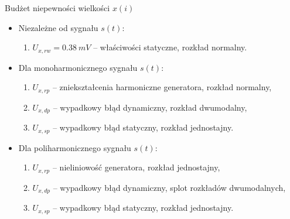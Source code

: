 \documentclass[12pt, polish, aspectratio = 169]{slides}
\begin{document}
\begin{frame}{Budżet niepewności wielkości $x(i)$}
\begin{itemize}
\item Niezależne od sygnału $s(t)$:
	\begin{enumerate}
	\item $U_{x,rw} = \qty{0.38}{mV}$ -- właściwości statyczne, rozkład normalny.
	\end{enumerate}
\item Dla monoharmonicznego sygnału $s(t)$:
	\begin{enumerate}
	\item $U_{x,rp}$ -- zniekształcenia harmoniczne generatora, rozkład normalny,
	\item $U_{x,dp}$ -- wypadkowy błąd dynamiczny, rozkład dwumodalny,
	\item $U_{x,sp}$ -- wypadkowy błąd statyczny, rozkład jednostajny.
	\end{enumerate}
\item Dla poliharmonicznego sygnału $s(t)$:
	\begin{enumerate}
	\item $U_{x,rp}$ -- nieliniowość generatora, rozkład jednostajny,
	\item $U_{x,dp}$ -- wypadkowy błąd dynamiczny, splot rozkładów dwumodalnych,
	\item $U_{x,sp}$ -- wypadkowy błąd statyczny, rozkład jednostajny.
	\end{enumerate}
\end{itemize}
\end{frame}
\end{document}
